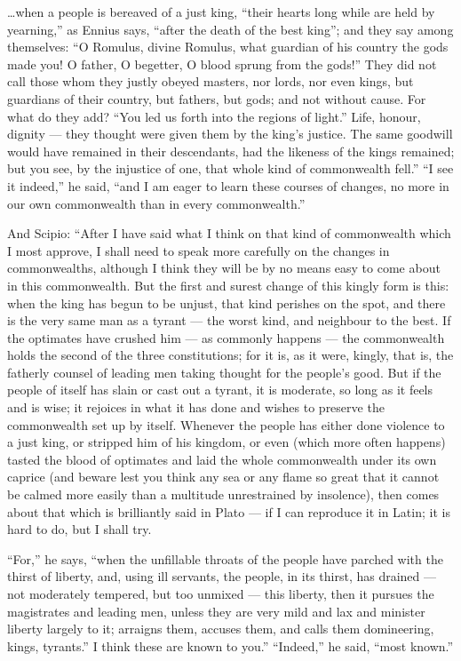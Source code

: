  \ldots when a people is bereaved of a just king, ``their hearts long while are held by yearning,'' as Ennius says, ``after the death of the best king''; and they say among themselves: ``O Romulus, divine Romulus, what guardian of his country the gods made you! O father, O begetter, O blood sprung from the gods!'' They did not call those whom they justly obeyed masters, nor lords, nor even kings, but guardians of their country, but fathers, but gods; and not without cause. For what do they add? ``You led us forth into the regions of light.'' Life, honour, dignity --- they thought were given them by the king's justice. The same goodwill would have remained in their descendants, had the likeness of the kings remained; but you see, by the injustice of one, that whole kind of commonwealth fell.'' ``I see it indeed,'' he said, ``and I am eager to learn these courses of changes, no more in our own commonwealth than in every commonwealth.''

 And Scipio: ``After I have said what I think on that kind of commonwealth which I most approve, I shall need to speak more carefully on the changes in commonwealths, although I think they will be by no means easy to come about in this commonwealth. But the first and surest change of this kingly form is this: when the king has begun to be unjust, that kind perishes on the spot, and there is the very same man as a tyrant --- the worst kind, and neighbour to the best. If the optimates have crushed him --- as commonly happens --- the commonwealth holds the second of the three constitutions; for it is, as it were, kingly, that is, the fatherly counsel of leading men taking thought for the people's good. But if the people of itself has slain or cast out a tyrant, it is moderate, so long as it feels and is wise; it rejoices in what it has done and wishes to preserve the commonwealth set up by itself. Whenever the people has either done violence to a just king, or stripped him of his kingdom, or even (which more often happens) tasted the blood of optimates and laid the whole commonwealth under its own caprice (and beware lest you think any sea or any flame so great that it cannot be calmed more easily than a multitude unrestrained by insolence), then comes about that which is brilliantly said in Plato --- if I can reproduce it in Latin; it is hard to do, but I shall try.

 ``For,'' he says, ``when the unfillable throats of the people have parched with the thirst of liberty, and, using ill servants, the people, in its thirst, has drained --- not moderately tempered, but too unmixed --- this liberty, then it pursues the magistrates and leading men, unless they are very mild and lax and minister liberty largely to it; arraigns them, accuses them, and calls them domineering, kings, tyrants.'' I think these are known to you.'' ``Indeed,'' he said, ``most known.''

